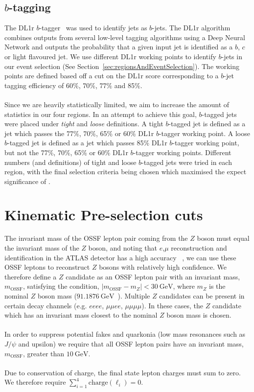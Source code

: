 \subsection{$b$-tagging}
The DL1r $b$-tagger~\cite{DL1r-paper} was used to identify jets as $b$-jets. The DL1r algorithm combines outputs from several low-level tagging algorithms using a Deep Neural Network and outputs the probability that a given input jet is identified as a $b$, $c$ or light flavoured jet. We use different DL1r working points to identify $b$-jets in our event selection (See Section~\ref{sec:regionsAndEventSelection}). The working points are defined based off a cut on the DL1r score corresponding to a $b$-jet tagging efficiency of 60$\%$, 70$\%$, 77$\%$ and 85$\%$. \\\\
Since we are heavily statistically limited, we aim to increase the amount of statistics in our four regions. In an attempt to achieve this goal, $b$-tagged jets were placed under \textit{tight} and \textit{loose} definitions. A tight $b$-tagged jet is defined as a jet which passes the 77$\%$, 70$\%$, 65$\%$ or 60$\%$ DL1r $b$-tagger working point. A loose $b$-tagged jet is defined as a jet which passes 85$\%$ DL1r $b$-tagger working point, but not the 77$\%$, 70$\%$, 65$\%$ or 60$\%$ DL1r $b$-tagger working points. Different numbers (and definitions) of tight and loose $b$-tagged jets were tried in each region, with the final selection criteria being chosen which maximised the expect significance of \tWZ.

\section{Kinematic Pre-selection cuts}
The invariant mass of the OSSF lepton pair coming from the $Z$ boson must equal the invariant mass of the $Z$ boson, and noting that $e$,$\mu$ reconstruction and identification in the ATLAS detector has a high accuracy ~\cite{}, we can use these OSSF leptons to reconstruct $Z$ bosons with relatively high confidence. We therefore define a $Z$ candidate as an OSSF lepton pair with an invariant mass, $m_{\text{OSSF}}$, satisfying the condition, $|m_{\text{OSSF}} - m_Z| <  \SI{30}{\GeV}$, where $m_Z$ is the nominal $Z$ boson mass ($\SI{91.1876}{\GeV}$~\cite{pdg}). Multiple $Z$ candidates can be present in certain decay channels (e.g. $eeee$, $\mu\mu ee$, $\mu \mu \mu \mu$). In these cases, the $Z$ candidate which has an invariant mass closest to the nominal $Z$ boson mass is chosen.\\\\
In order to suppress potential fakes and quarkonia (low mass resonances such as $J/\psi$ and upsilon) we require that all OSSF lepton pairs have an invariant mass, $m_{\text{OSSF}}$, greater than $\SI{10}{\GeV}$.\\\\
Due to conservation of charge, the final state lepton charges must sum to zero.\\ We therefore require $\displaystyle\sum_{i=1}^{4} \text{charge}(\ell_i) = 0$.

